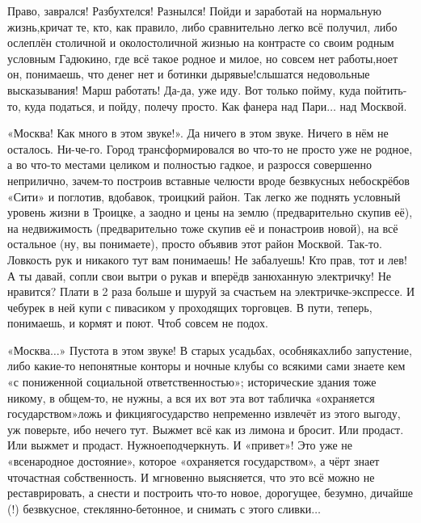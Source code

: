 \mdash Право, заврался! Разбухтелся! Разнылся! Пойди и заработай на нормальную жизнь,\mdash кричат те, кто, как правило, либо сравнительно легко всё получил, либо ослеплён столичной и околостоличной жизнью на контрасте со своим родным условным Гадюкино, где всё такое родное и милое, но совсем нет работы,\mdash ноет он, понимаешь, что денег нет и ботинки дырявые!\mdash слышатся недовольные высказывания! Марш работать! Да-да, уже иду. Вот только пойму, куда пойтить-то, куда податься, и пойду, полечу просто. Как фанера над Пари$\ldots$ над Москвой. 

«Москва! Как много в этом звуке!». Да ничего в этом звуке. Ничего в нём не осталось. Ни-че-го. Город трансформировался во что-то не просто уже не родное, а во что-то местами целиком и полностью гадкое, и разросся совершенно неприлично, зачем-то построив вставные челюсти вроде безвкусных небоскрёбов «Сити» и поглотив, вдобавок, троицкий район. Так легко же поднять условный уровень жизни в Троицке, а заодно и цены на землю (предварительно скупив её), на недвижимость (предварительно тоже скупив её и понастроив новой), на всё остальное (ну, вы понимаете), просто объявив этот район Москвой. Так-то. Ловкость рук и никакого тут вам понимаешь! Не забалуешь! Кто прав, тот и лев! А ты давай, сопли свои вытри о рукав и вперёд\mdash в занюханную электричку! Не нравится? Плати в 2 раза больше и шуруй за счастьем на электричке-экспрессе. И чебурек в ней купи с пивасиком у проходящих торговцев. В пути, теперь, понимаешь, и кормят и поют. Чтоб совсем не подох.

«Москва$\ldots$» Пустота в этом звуке! В старых усадьбах, особняках\mdash либо запустение, либо какие-то непонятные конторы и ночные клубы со всякими сами знаете кем «с пониженной социальной ответственностью»; исторические здания тоже никому, в общем-то, не нужны, а вся их вот эта вот табличка «охраняется государством»\mdash ложь и фикция\mdash государство непременно извлечёт из этого выгоду, уж поверьте, ибо нечего тут. Выжмет всё как из лимона и бросит. Или продаст. Или выжмет и продаст. Нужное\mdash подчеркнуть. И «привет»! Это уже не «всенародное достояние», которое «охраняется государством», а чёрт знает что\mdash  частная собственность. И мгновенно выясняется, что это всё можно не реставрировать, а снести и построить что-то новое, дорогущее, безумно, дичайше (!) безвкусное, стеклянно-бетонное, и снимать с этого сливки$\ldots$ 

